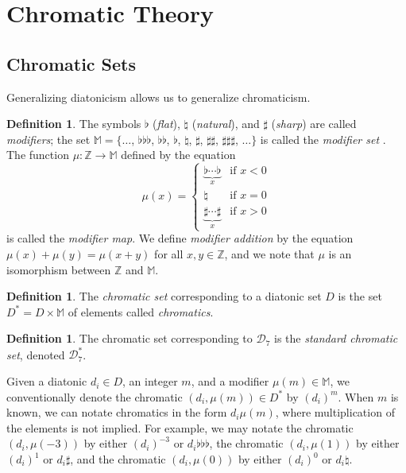 \documentclass{article}
\theoremstyle{plain}
\theoremstyle{definition}
\newtheorem{definition}[theorem]{Definition}
\theoremstyle{remark}
\begin{document}
\section{Chromatic Theory}
\label{SEC.Chromatic Theory}

\subsection{Chromatic Sets}

Generalizing diatonicism allows us to generalize chromaticism.

\begin{definition}
	The symbols $\flat$ (\textit{flat}), $\natural$ (\textit{natural}), and $\sharp$ (\textit{sharp}) are called \textit{modifiers}; the set $\mathbb{M}=\{\dots$, $\flat\flat\flat$, $\flat\flat$, $\flat$, $\natural$, $\sharp$, $\sharp\sharp$, $\sharp\sharp\sharp$, $\dots\}$ is called the \textit{modifier set} \cite{Hook}. The function $\mu:\mathbb{Z}\to\mathbb{M}$ defined by the equation $$\mu(x)=\begin{cases} \underbrace{\flat\cdots\flat}_x & \textrm{if } x<0 \\ \natural & \textrm{if } x=0 \\ \underbrace{\sharp\cdots\sharp}_x & \textrm{if } x>0 \end{cases}$$ is called the \textit{modifier map}. We define \textit{modifier addition} by the equation $\mu(x)+\mu(y)=\mu(x+y)$ for all $x,y\in\mathbb{Z}$, and we note that $\mu$ is an isomorphism between $\mathbb{Z}$ and $\mathbb{M}$.
\end{definition}

\begin{definition}
	The \textit{chromatic set} corresponding to a diatonic set $D$ is the set $D^\ast=D\times\mathbb{M}$ of elements called \textit{chromatics}.
\end{definition}

\begin{definition}
	The chromatic set corresponding to $\mathcal{D}_7$  is the \textit{standard chromatic set}, denoted $\mathcal{D}_7^\ast$.
\end{definition}

Given a diatonic $d_i\in D$, an integer $m$, and a modifier $\mu(m)\in\mathbb{M}$, we conventionally denote the chromatic $(d_i,\mu(m))\in D^\ast$ by $(d_i)^m$. When $m$ is known, we can notate chromatics in the form $d_i\mu(m)$, where multiplication of the elements is not implied. For example, we may notate the chromatic $(d_i,\mu(-3))$ by either $(d_i)^{-3}$ or $d_i\flat\flat\flat$, the chromatic $(d_i,\mu(1))$ by either $(d_i)^1$ or $d_i\sharp$, and the chromatic $(d_i,\mu(0))$ by either $(d_i)^0$ or $d_i\natural$. 
\end{document}
